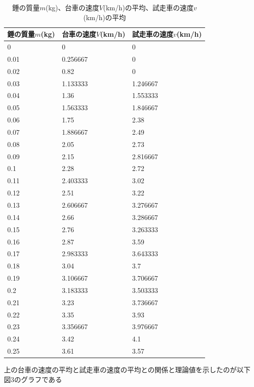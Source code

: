 \documentclass{jlreq}
\begin{document}
  \begin{table}[H]
    \centering
    \caption{錘の質量$m$(kg)、台車の速度$V$(km/h)の平均、試走車の速度$v$(km/h)の平均}
    \begin{tabular}{|l|l|l|}
    \hline
    錘の質量$m$(kg) & 台車の速度$V$(km/h) & 試走車の速度$v$(km/h) \\ \hline
    0    &        0 & 0\\ \hline
    0.01 & 0.256667 & 0 \\ \hline
    0.02 & 0.82 & 0 \\ \hline
    0.03 & 1.133333 & 1.246667 \\ \hline
    0.04 & 1.36 & 1.553333 \\ \hline
    0.05 & 1.563333 & 1.846667 \\ \hline
    0.06 & 1.75 & 2.38 \\ \hline
    0.07 & 1.886667 & 2.49 \\ \hline
    0.08 & 2.05 & 2.73 \\ \hline
    0.09 & 2.15 & 2.816667 \\ \hline
    0.1 & 2.28 & 2.72 \\ \hline
    0.11 & 2.403333 & 3.02 \\ \hline
    0.12 & 2.51 & 3.22 \\ \hline
    0.13 & 2.606667 & 3.276667 \\ \hline
    0.14 & 2.66 & 3.286667 \\ \hline
    0.15 & 2.76 & 3.263333 \\ \hline
    0.16 & 2.87 & 3.59 \\ \hline
    0.17 & 2.983333 & 3.643333 \\ \hline
    0.18 & 3.04 & 3.7 \\ \hline
    0.19 & 3.106667 & 3.706667 \\ \hline
    0.2 & 3.183333 & 3.503333 \\ \hline
    0.21 & 3.23 & 3.736667 \\ \hline
    0.22 & 3.35 & 3.93 \\ \hline
    0.23 & 3.356667 & 3.976667 \\ \hline
    0.24 & 3.42 & 4.1 \\ \hline
    0.25 & 3.61 & 3.57 \\ \hline
  \end{tabular}
  \end{table}
  上の台車の速度の平均と試走車の速度の平均との関係と理論値を示したのが以下図3のグラフである
\end{document}
